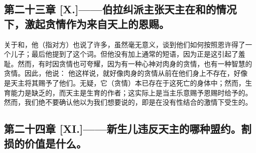 
\subsection{第二十三章 [X.]——伯拉纠派主张天主在和的情况下，激起贪情作为来自天上的恩赐。}

关于和，他（指对方）也说了许多，虽然毫无意义，谈到他们如何按照恩许得了一个儿子；最后他提到了这个词。但他没有加上通常的短语，因为正是这引起了羞耻。然而，有时因贪情也可夸耀，因为有一种心神对肉身的贪情，也有一种智慧的贪情。因此，他说： 他这样说，就好像肉身的贪情从前在他们身上不存在，好像是天主将其赐予了他们。无疑，它（贪情）本已存在于这死亡的身体中；然而，生育能力是缺乏的，而天主是生育的作者；这实际上是当主乐意赐予恩赐时给予的。然而，我们绝不要确认他以为我们想要说的，即是在没有性结合的激情下受生的。\par


\subsection{第二十四章 [XI.]——新生儿违反天主的哪种盟约。割损的价值是什么。}

